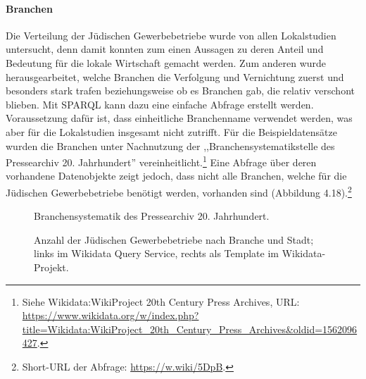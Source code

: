 \paragraph{Branchen} Die Verteilung der Jüdischen Gewerbebetriebe wurde von allen Lokalstudien untersucht, denn damit konnten zum einen Aussagen zu deren Anteil und Bedeutung für die lokale Wirtschaft gemacht werden. Zum anderen wurde herausgearbeitet, welche Branchen die Verfolgung und Vernichtung zuerst und besonders stark trafen beziehungsweise ob es Branchen gab, die relativ verschont blieben. Mit SPARQL kann dazu eine einfache Abfrage erstellt werden. Voraussetzung dafür ist, dass einheitliche Branchenname verwendet werden, was aber für die Lokalstudien insgesamt nicht zutrifft. Für die Beispieldatensätze wurden die Branchen unter Nachnutzung der ,,Branchensystematikstelle des Pressearchiv 20. Jahrhundert'' vereinheitlicht.\footnote{Siehe Wikidata:WikiProject 20th Century Press Archives, URL: \url{https://www.wikidata.org/w/index.php?title=Wikidata:WikiProject\_20th\_Century\_Press\_Archives\&oldid=1562096427}.} Eine Abfrage über deren vorhandene Datenobjekte zeigt jedoch, dass nicht alle Branchen, welche für die Jüdischen Gewerbebetriebe benötigt werden, vorhanden sind (Abbildung 4.18).\footnote{Short-URL der Abfrage: \url{https://w.wiki/5DpB}.} 

\begin{figure}[h]
    \centering
    \caption{Branchensystematik des Pressearchiv 20. Jahrhundert.}
    \label{fig:x cubed graph}
\end{figure}

\begin{figure}[h]
    \centering
    \caption{Anzahl der Jüdischen Gewerbebetriebe nach Branche und Stadt; links im Wikidata Query Service, rechts als Template im Wikidata-Projekt.}
    \label{fig:x cubed graph}
\end{figure}

